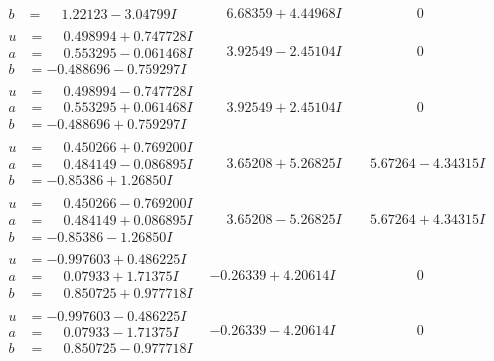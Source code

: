 \documentclass[1p]{elsarticle_modified}
\theoremstyle{definition}
\begin{document}
$$\begin{array}{c|c|c}
\begin{aligned}
b &= \phantom{-}1.22123 - 3.04799 I\end{aligned}
 & \phantom{-}6.68359 + 4.44968 I & \phantom{-0.000000 } 0 \\ \hline\begin{aligned}
u &= \phantom{-}0.498994 + 0.747728 I \\
a &= \phantom{-}0.553295 - 0.061468 I \\
b &= -0.488696 - 0.759297 I\end{aligned}
 & \phantom{-}3.92549 - 2.45104 I & \phantom{-0.000000 } 0 \\ \hline\begin{aligned}
u &= \phantom{-}0.498994 - 0.747728 I \\
a &= \phantom{-}0.553295 + 0.061468 I \\
b &= -0.488696 + 0.759297 I\end{aligned}
 & \phantom{-}3.92549 + 2.45104 I & \phantom{-0.000000 } 0 \\ \hline\begin{aligned}
u &= \phantom{-}0.450266 + 0.769200 I \\
a &= \phantom{-}0.484149 - 0.086895 I \\
b &= -0.85386 + 1.26850 I\end{aligned}
 & \phantom{-}3.65208 + 5.26825 I & \phantom{-}5.67264 - 4.34315 I \\ \hline\begin{aligned}
u &= \phantom{-}0.450266 - 0.769200 I \\
a &= \phantom{-}0.484149 + 0.086895 I \\
b &= -0.85386 - 1.26850 I\end{aligned}
 & \phantom{-}3.65208 - 5.26825 I & \phantom{-}5.67264 + 4.34315 I \\ \hline\begin{aligned}
u &= -0.997603 + 0.486225 I \\
a &= \phantom{-}0.07933 + 1.71375 I \\
b &= \phantom{-}0.850725 + 0.977718 I\end{aligned}
 & -0.26339 + 4.20614 I & \phantom{-0.000000 } 0 \\ \hline\begin{aligned}
u &= -0.997603 - 0.486225 I \\
a &= \phantom{-}0.07933 - 1.71375 I \\
b &= \phantom{-}0.850725 - 0.977718 I\end{aligned}
 & -0.26339 - 4.20614 I & \phantom{-0.000000 } 0 \\ \hline\begin{aligned}

\end{aligned}
\end{array}$$
\end{document}

